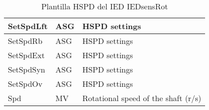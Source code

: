 \begin{table}[H]
\begin{center}
\begin{tabular}{|l|l|p{8.5cm}|}
            \hline
            SetSpdLft & ASG & HSPD settings \\
            \hline
            SetSpdRb & ASG & HSPD settings \\
            \hline
            SetSpdExt & ASG & HSPD settings \\
            \hline
            SetSpdSyn & ASG & HSPD settings \\
            \hline
            SetSpdOv & ASG & HSPD settings \\
            \hline
            Spd & MV & Rotational speed of the shaft (r/s) \\
            \hline
    \end{tabular}
    \caption{Plantilla HSPD del IED IEDsensRot}
    \label{table:lnTypeHSPD_1}
    \end{center}
    \end{table}
    
    
    